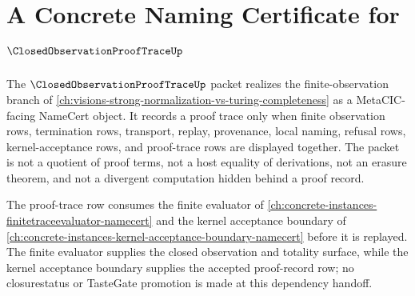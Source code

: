 \chapter{A Concrete Naming Certificate for $\ClosedObservationProofTraceUp$}
\label{ch:concrete-instances-closed-observation-proof-trace-namecert}

The $\ClosedObservationProofTraceUp$ packet realizes the finite-observation branch of \autoref{ch:visions-strong-normalization-vs-turing-completeness} as a MetaCIC-facing NameCert object. It records a proof trace only when finite observation rows, termination rows, transport, replay, provenance, local naming, refusal rows, kernel-acceptance rows, and proof-trace rows are displayed together. The packet is not a quotient of proof terms, not a host equality of derivations, not an erasure theorem, and not a divergent computation hidden behind a proof record.

The proof-trace row consumes the finite evaluator of \autoref{ch:concrete-instances-finitetraceevaluator-namecert} and the kernel acceptance boundary of \autoref{ch:concrete-instances-kernel-acceptance-boundary-namecert} before it is replayed. The finite evaluator supplies the closed observation and totality surface, while the kernel acceptance boundary supplies the accepted proof-record row; no closurestatus or TasteGate promotion is made at this dependency handoff.

